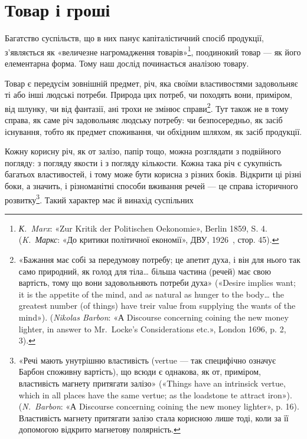 
\chapter{Товар і гроші}


Багатство суспільств, що в них панує капіталістичний спосіб
продукції, з’являється як «величезне нагромадження товарів»\footnote{
\emph{К.~Marx}: «Zur Kritik der Politischen Oekonomie», Berlin 1859,
S. 4. (\emph{K.~Маркс}: «До критики політичної економії», ДВУ, 1926~,
стор. 45).
},
поодинокий товар — як його елементарна форма. Тому наш
дослід починається аналізою товару.

Товар є передусім зовнішній предмет, річ, яка своїми властивостями
задовольняє ті або інші людські потреби. Природа цих
потреб, чи походять вони, приміром, від шлунку, чи від фантазії,
ані трохи не змінює справи\footnote{
«Бажання має собі за передумову потребу; це апетит духа, і він
для нього так само природний, як голод для тіла\dots{} більша частина (речей)
має свою вартість, тому що вони задовольняють потреби духа» («Desire
implies want; it is the appetite of the mind, and as natural as hunger to
the body\dots{} the greatest number (of things) have treir value from supplying
the wants of the mind»). (\emph{Nikolas Barbon}: «А Discourse concerning coining
the new money lighter, in answer to Mr.~Locke’s Considerations
etc.», London 1696, p. 2, 3).
}. Тут також не в тому справа, як саме
річ задовольняє людську потребу: чи безпосередньо, як засіб
існування, тобто як предмет споживання, чи обхідним шляхом,
як засіб продукції.

Кожну корисну річ, як от залізо, папір тощо, можна розглядати
з подвійного погляду: з погляду якости і з погляду кількости.
Кожна така річ є сукупність багатьох властивостей, і тому
може бути корисна з різних боків. Відкрити ці різні боки, а значить,
і різноманітні способи вживання речей — це справа історичного
розвитку\footnote{
«Речі мають унутрішню властивість (vertue — так специфічно
означує Барбон споживну вартість), що всюди є однакова, як от, приміром,
властивість магнету притягати залізо» («Things have an intrinsick vertue,
which in all places have the same vertue; as the loadstone te attract iron»).
(\emph{N.~Barbon}: «А Discourse concerning coining the new money lighter»,
p. 16). Властивість магнету притягати залізо стала корисною лише тоді,
коли за її допомогою відкрито магнетову полярність.
}. Такий характер має й винахід суспільних
\parbreak{}  %
